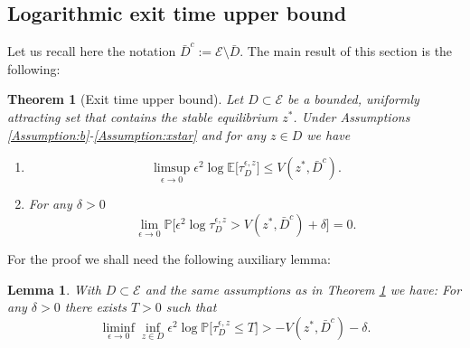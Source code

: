 \documentclass[10pt, reqno]{amsart}
\newcommand{\pr}{\mathbb{P}}
\newcommand{\ex}{\mathbb{E}}
\newcommand{\e}{\mathcal{E}}
\newtheorem{lem}{Lemma}
\newtheorem{thm}{Theorem}
\theoremstyle{definition}
\numberwithin{lem}{section}
\numberwithin{cor}{section}
\numberwithin{prop}{section}
\numberwithin{thm}{section}
\numberwithin{dfn}{section}
\begin{document}
\subsection{Logarithmic exit time upper bound}\label{Sec:ExitTimesUB} Let us recall here the notation $\bar{D}^c:=\e\setminus\bar{D}$. The main result of this section is the following:


\begin{thm}[Exit time upper bound]\label{thm:ExitTimeUpperBnd} Let $D\subset\e$ be a bounded, uniformly attracting set that contains the stable equilibrium $z^*$. Under Assumptions \ref{Assumption:b}-\ref{Assumption:xstar} and for any $z\in D$ we have
\begin{enumerate}
    \item $$\limsup_{\epsilon\to 0}\epsilon^2\log\ex\big[ \tau_D^{\epsilon,z}\big]\leq V(z^*, \bar{D}^c).$$
    \item For any $\delta>0$ $$\lim_{\epsilon\to 0}\pr\bigg[ \epsilon^2\log\tau_D^{\epsilon,z}>V(z^*, \bar{D}^c)+\delta \bigg]=0.$$
\end{enumerate}
\end{thm}
\noindent For the proof we shall need the following auxiliary lemma:  
\begin{lem}\label{lem:preupperbound} With $D\subset\e$ and the same assumptions as in Theorem \ref{thm:ExitTimeUpperBnd} we have: For any $\delta>0$ there exists $T>0$ such that 
\begin{equation*}
    \liminf_{\epsilon\to 0}\inf_{z\in D}\epsilon^2\log\pr\big[ \tau_D^{\epsilon, z}\leq T  \big]>-V(z^*,  \bar{D}^c)-\delta.
\end{equation*} 
\end{lem}
\end{document}
